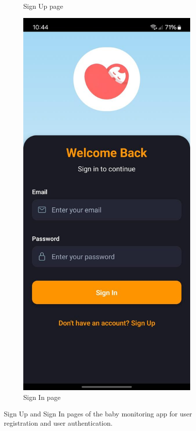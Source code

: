 \documentclass[12pt,a4paper]{report}
\begin{document}
\begin{figure}[htbp]
\begin{subfigure}[b]{0.22\textwidth}
    \caption{Sign Up page}
    \label{fig:sign-up}
\end{subfigure}
  \hspace{0.1\textwidth}
  \begin{subfigure}[b]{0.22\textwidth} %
      \centering
      \includegraphics[width=\textwidth]{./pic/sign-in.jpeg}
      \caption{Sign In page}
      \label{fig:sign-in}
  \end{subfigure}
  
  
  \caption{Sign Up and Sign In pages of the baby monitoring app for user registration and user authentication.}
    \label{fig:auth-pages}
\end{figure}
\end{document}
